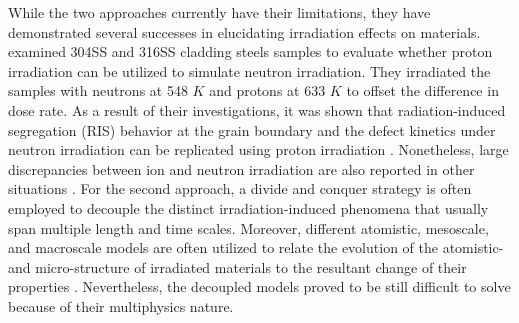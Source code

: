 \documentclass[utf8]{frontiersSCNS} %
\begin{document}
While the two approaches currently have their limitations, they have demonstrated several successes in elucidating irradiation effects on materials. \cite{was_emulation_2002} examined 304SS and 316SS cladding steels samples to evaluate whether proton irradiation can be utilized to simulate neutron irradiation. They irradiated the samples with neutrons at 548 $K$ and protons at 633 $K$ to offset the difference in dose rate. As a result of their investigations, it was shown that radiation-induced segregation (RIS) behavior at the grain boundary and the defect kinetics under neutron irradiation can be replicated using proton irradiation \cite{was_emulation_2002}. Nonetheless, large discrepancies between ion and neutron irradiation are also reported in other situations \cite{was2017}.  For the second approach, a divide and conquer strategy is often employed to decouple the distinct irradiation-induced phenomena that usually span multiple length and time scales. Moreover, different atomistic, mesoscale, and macroscale models are often utilized to relate the evolution of the atomistic- and micro-structure of irradiated materials to the resultant change of their properties \cite{was2017}. Nevertheless, the decoupled models proved to be still difficult to solve because of their multiphysics nature. 
\end{document}
